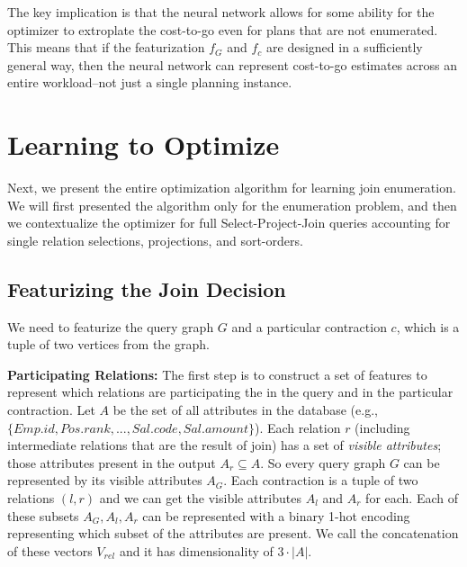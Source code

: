 The key implication is that the neural network allows for some ability for the optimizer to extroplate the cost-to-go even for plans that are not enumerated. This means that if the featurization $f_G$ and $f_c$ are designed in a sufficiently general way, then the neural network can represent cost-to-go estimates across an entire workload--not just a single planning instance.


\section{Learning to Optimize}
Next, we present the entire optimization algorithm for learning join enumeration.
We will first presented the algorithm only for the enumeration problem, and then we contextualize the optimizer for full Select-Project-Join queries accounting for single relation selections, projections, and sort-orders.

\subsection*{Featurizing the Join Decision}
We need to featurize the query graph $G$ and a particular contraction $c$, which is a tuple of two vertices from the graph. 

\vspace{0.5em} \noindent \textbf{Participating Relations: } The first step is to construct a set of features to represent which relations are participating the in the query and in the particular contraction. Let $A$ be the set of all attributes in the database (e.g., $ \{Emp.id, Pos.rank,...,Sal.code,Sal.amount\}$). Each relation $r$ (including intermediate relations that are the result of join) has a set of \emph{visible attributes}; those attributes present in the output $A_r \subseteq A$. So every query graph $G$ can be represented by its visible attributes $A_G$. Each contraction is a tuple of two relations $(l,r)$ and we can get the visible attributes $A_l$ and $A_r$ for each. Each of these subsets $A_G, A_l, A_r$ can be represented with a binary 1-hot encoding representing which subset of the attributes are present. We call the concatenation of these vectors $V_{rel}$ and it has dimensionality of $3\cdot|A|$. 

